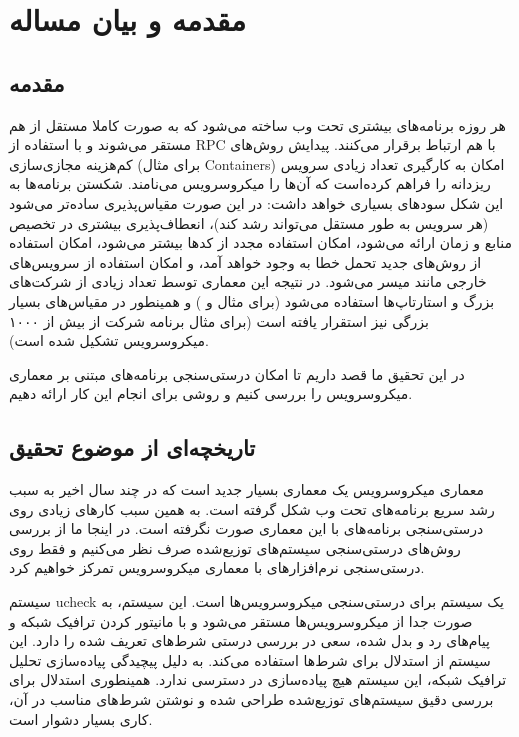 
\chapter{مقدمه و بیان مساله}
\section{مقدمه}
هر روزه برنامه‌های بیشتری تحت وب ساخته می‌شود که به صورت کاملا مستقل از هم مستقر می‌شوند و با استفاده از
\gls{RPC}
با هم ارتباط برقرار می‌کنند. پیدایش روش‌های کم‌هزینه مجازی‌سازی (برای مثال
\glspl{Container})
امکان به کارگیری تعداد زیادی سرویس ریزدانه را فراهم کرده‌‌است که آن‌ها را میکروسرویس می‌نامند. شکستن برنامه‌ها به این شکل سودهای بسیاری خواهد داشت:‌ در این صورت مقیاس‌پذیری ساده‌تر می‌شود (هر سرویس به طور مستقل می‌تواند رشد کند)،‌ انعطاف‌پذیری بیشتری در تخصیص منابع و زمان ارائه می‌شود، امکان استفاده مجدد از کدها بیشتر می‌شود، امکان استفاده از روش‌های جدید تحمل خطا به وجود خواهد آمد، و امکان استفاده از سرویس‌های خارجی مانند
میسر می‌شود. در نتیجه این معماری توسط تعداد زیادی از شرکت‌های بزرگ و استارتاپ‌ها استفاده می‌شود (برای مثال
 \cite{toddhoff2020}
و
 \cite{tonymauro2020})
و همینطور در مقیاس‌های بسیار بزرگی نیز استقرار یافته است (برای مثال برنامه شرکت
 \cite{toddhoff2020}
از بیش از ۱۰۰۰ میکروسرویس تشکیل شده است).

در این تحقیق ما قصد داریم تا امکان درستی‌سنجی برنامه‌های مبتنی بر معماری میکروسرویس را بررسی کنیم و روشی برای انجام این کار ارائه دهیم.

\section{تاریخچه‌ای از موضوع تحقیق}
معماری میکروسرویس یک معماری بسیار جدید است که در چند سال اخیر به سبب رشد سریع برنامه‌های تحت وب شکل گرفته است. به همین سبب کارهای زیادی روی درستی‌سنجی برنامه‌های با این معماری صورت نگرفته است. در اینجا ما از بررسی روش‌های درستی‌سنجی سیستم‌های توزیع‌شده صرف نظر می‌کنیم و فقط روی درستی‌سنجی نرم‌افزارهای با معماری میکروسرویس تمرکز خواهیم کرد.

سیستم
ucheck \cite{panda2017verification}
یک سیستم برای درستی‌سنجی میکروسرویس‌ها است. این سیستم،‌ به صورت جدا از میکروسرویس‌ها مستقر می‌شود و با مانیتور کردن ترافیک شبکه و پیام‌های رد و بدل شده، سعی در بررسی درستی شرط‌های تعریف شده را دارد. این سیستم از استدلال
 \cite{Jones83}
برای شرط‌ها استفاده می‌کند. به دلیل پیچیدگی پیاده‌سازی تحلیل ترافیک شبکه، این سیستم هیچ پیاده‌سازی در دسترسی ندارد. همینطوری استدلال
برای بررسی دقیق سیستم‌های توزیع‌شده طراحی شده و نوشتن شرط‌های مناسب در آن، کاری بسیار دشوار است.

